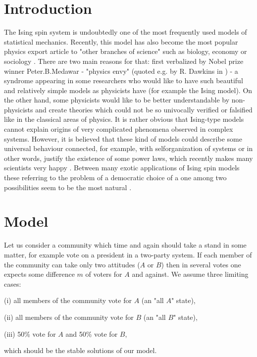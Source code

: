 \section{Introduction}
 The Ising spin system is undoubtedly one of the most
frequently used models of statistical mechanics. Recently, this
model has also become the most popular physics export article to
"other branches of science" such as biology, economy or sociology
\cite{Stauffer,Holyst,Derrida,FG}.
There are two main reasons for that: first verbalized by Nobel prize winner
Peter.B.Medawar - "physics envy" (quoted e.g. by R. Dawkins in \cite{Brockman})
- a syndrome appearing in some
researchers who would like to have such beautiful and relatively
simple models as physicists have (for example the Ising model). On the
other hand, some physicists would like to be better understandable
by non-physicists and create theories which could not be so
univocally verified or falsified like in the classical areas of
physics. It is rather obvious that Ising-type models cannot
explain origins of very complicated phenomena observed in complex
systems. However, it is believed that these kind of models could
describe some universal behaviour connected, for example, with
selforganization of systems \cite{Bak,BS} or in other words, justify the
existence of some power laws, which recently  makes many
scientists very happy \cite{Stauffer1}. 
Between many exotic applications of Ising spin models these referring 
to the problem of a democratic choice of a one among two possibilities 
seem to be the most natural \cite{Holyst,FG,Stauffer2,Galam,HKS}.

\section{Model}

Let us consider a community which time and again should
take a stand in some matter, for example vote on a president in 
a two-party system. If each member of the
community can take only two attitudes ($A$ or $B$) then in several
votes one expects some difference $m$ of voters for $A$ and against.
We assume three limiting cases:

(i)
all members of the community vote for $A$ (an "all $A$" state),

(ii)
all members of the community vote for $B$ (an "all $B$" state),

(iii)
50\% vote for $A$ and 50\% vote for $B$,

\noindent
which should be the stable solutions of our model.

